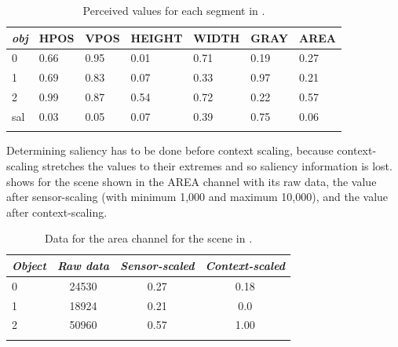\begin{table}
\begin{center}
\begin{tabular}{  l   l   l   l   l   l   l  }
\lsptoprule
{\itshape obj} & HPOS & VPOS & HEIGHT & WIDTH & GRAY & AREA \\ \midrule
0 & 0.66 & 0.95 & 0.01 & 0.71 & 0.19 & 0.27\\ 
1 & 0.69 & 0.83 & 0.07 & 0.33 & 0.97 & 0.21\\ 
2 & 0.99 & 0.87 & 0.54 & 0.72 & 0.22 & 0.57\\ 
sal & 0.03 & 0.05 & 0.07 & 0.39 & 0.75 & 0.06 \\ 
\lspbottomrule
\end{tabular}
\caption{Perceived values for each segment in .
\label{tab:rect1b}}
\end{center}
\end{table}

Determining saliency has to be done before context scaling, because
context-scaling stretches the values to their extremes and so 
saliency information is lost. 
 shows for the scene shown in
 the AREA channel with its
raw data, the value after 
sensor-scaling (with minimum 1,000 and maximum 
10,000), and the value after context-scaling. 

\begin{table}
\begin{center}
\begin{tabular}{  l   c   c   c  } \lsptoprule
{\itshape Object} & {\itshape Raw data} & {\itshape Sensor-scaled} &  {\itshape Context-scaled} \\ \midrule
0 & 24530 & 0.27 & 0.18 \\ 
1 & 18924 & 0.21 & 0.0\\ 
2 & 50960 & 0.57 & 1.00 \\ 
\lspbottomrule
\end{tabular}
\caption{Data for the area channel for the scene in .
\label{tab:rect1b-area}}
\end{center}
\end{table}

